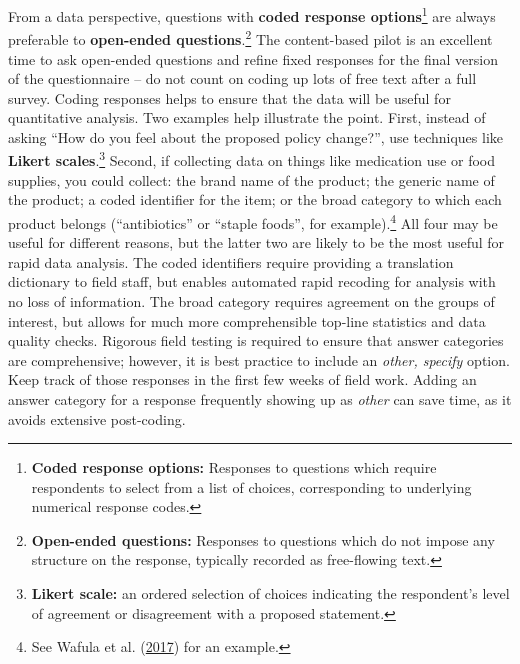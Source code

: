 \documentclass[
]{book}
\begin{document}
From a data perspective, questions with \textbf{coded response options}\footnote{\textbf{Coded response options:} Responses to questions which require respondents
  to select from a list of choices, corresponding to underlying numerical response codes.}
are always preferable to \textbf{open-ended questions}.\footnote{\textbf{Open-ended questions:} Responses to questions which do not
  impose any structure on the response, typically recorded as free-flowing text.}
The content-based pilot is an excellent time to ask open-ended questions
and refine fixed responses for the final version of the questionnaire --
do not count on coding up lots of free text after a full survey.
Coding responses helps to ensure that the data
will be useful for quantitative analysis.
Two examples help illustrate the point.
First, instead of asking ``How do you feel about the proposed policy change?'',
use techniques like \textbf{Likert scales}.\footnote{\textbf{Likert scale:} an ordered selection of choices indicating the respondent's level of agreement or disagreement with a proposed statement.}
Second, if collecting data on things like medication use or food supplies, you could collect:
the brand name of the product; the generic name of the product; a coded identifier for the item;
or the broad category to which each product belongs
(``antibiotics'' or ``staple foods'', for example).\footnote{See Wafula et al. (\protect\hyperlink{ref-wafula2017examining}{2017}) for an example.}
All four may be useful for different reasons,
but the latter two are likely to be the most useful for rapid data analysis.
The coded identifiers require providing a translation dictionary to field staff,
but enables automated rapid recoding for analysis with no loss of information.
The broad category requires agreement on the groups of interest,
but allows for much more comprehensible top-line statistics and data quality checks.
Rigorous field testing is required to ensure that answer categories are comprehensive;
however, it is best practice to include an \emph{other, specify} option.
Keep track of those responses in the first few weeks of field work.
Adding an answer category for a response frequently showing up as \emph{other} can save time,
as it avoids extensive post-coding.
\end{document}
